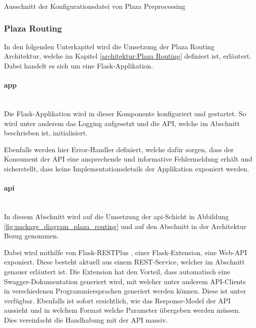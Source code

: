 \begin{listing}[ht]
    \inputminted{YAML}{projectdoc/listing/preprocess_config.yml}
    \caption{Ausschnitt der Konfigurationsdatei von Plaza Preprocessing}
    \label{listing:preprocess_config}
\end{listing}


\subsubsection{Plaza Routing}
\label{impl:Plaza Routing}
In den folgenden Unterkapitel wird die Umsetzung der Plaza Routing Architektur, welche im Kapitel \ref{architektur:Plaza Routing} definiert ist, erläutert. Dabei handelt es sich um eine Flask-Applikation\cite{flask}.

\paragraph{app}\label{impl:app-layer}~\\
Die Flask-Applikation\cite{flask} wird in dieser Komponente konfiguriert und gestartet. So wird unter anderem das Logging aufgesetzt und die \ac{API}, welche im Abschnitt  beschrieben ist, initialisiert.

Ebenfalls werden hier Error-Handler definiert, welche dafür sorgen, dass der Konsument der \ac{API} eine ansprechende und informative Fehlermeldung erhält und sicherstellt, dass keine Implementationsdetails der Applikation exponiert werden.

\paragraph{api}\label{impl:Plaza Routing api}~\\
In diesem Abschnitt wird auf die Umsetzung der api-Schicht in Abbildung \ref{fig:package_diagram_plaza_routing} und auf den Abschnitt  in der Architektur Bezug genommen.

Dabei wird mithilfe von Flask-RESTPlus \cite{flask-restplus}, einer Flask-Extension, eine Web-\ac{API} exponiert. Diese besteht aktuell aus einem \ac{REST}-Service, welcher im Abschnitt  genauer erläutert ist. Die Extension hat den Vorteil, dass automatisch eine Swagger-Dokumentation \cite{swagger} generiert wird, mit welcher unter anderem \ac{API}-Clients in verschiedenen Programmiersprachen generiert werden können. Diese ist unter \cite{plaza-routing-api-swaggerui} verfügbar. Ebenfalls ist sofort ersichtlich, wie das Response-Model der \ac{API} aussieht und in welchem Format welche Parameter übergeben werden müssen. Dies vereinfacht die Handhabung mit der \ac{API} massiv.

